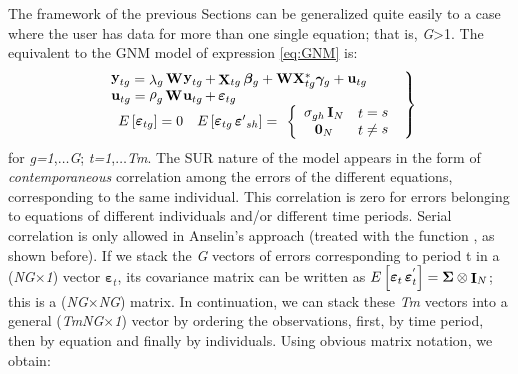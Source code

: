 \documentclass[article]{jss}
\begin{document}
The framework of the previous Sections can be generalized quite easily to a case where the user has data for more than one single equation; that is, \emph{G}\textgreater{}1. The equivalent to the GNM model of expression \eqref{eq:GNM} is:
\begin{equation}
\left.\begin{array}{lll}

{\mathop{{\bf y}}\nolimits_{tg} =\mathop{\lambda }\nolimits_{g} {\bf W} \mathop{{\bf y}}\nolimits_{tg} +\mathop{{\bf X}}\nolimits_{tg} {\boldsymbol \beta}_{g}+{\bf W} {\bf X}_{tg}^* {\boldsymbol \gamma}_{g}+\mathop{{\bf u}}\nolimits_{tg} } \\
{\mathop{{\bf u}}\nolimits_{tg} =\mathop{\rho }\nolimits_{g} {\bf W} \mathop{{\bf u}}\nolimits_{tg} +\mathop{{\boldsymbol \varepsilon}}\nolimits_{tg} }\\
\begin{array}{cc}

 {E\left[\mathop{{\boldsymbol \varepsilon}}\nolimits_{tg} \right]=0} & {E\left[\mathop{{\boldsymbol \varepsilon}}\nolimits_{\mathop{tg}} \mathop{{\boldsymbol \varepsilon}'}\nolimits_{\mathop{sh}} \right]=}
\end{array}

\left\{\begin{array}{cc} {\mathop{\sigma}\nolimits_{gh} {\bf I}_{N}} & {\mathop{t} = \mathop{s}} \\ {{\bf 0}_{N} } & {\mathop{t} \ne \mathop{s} }
\end{array}\right.

\end{array}\right\}
\label{eq:sure}
\end{equation}
for \emph{g=1},\(\ldots\)\emph{G}; \emph{t=1},\(\ldots\)\emph{Tm}. The SUR nature of the model appears in the form of \emph{contemporaneous} correlation among the errors of the different equations, corresponding to the same individual. This correlation is zero for errors belonging to equations of different individuals and/or different time periods. Serial correlation is only allowed in Anselin's approach (treated with the function , as shown before). If we stack the \emph{G} vectors of errors corresponding to period t in a (\emph{NG}\(\times\)\emph{1}) vector \({\boldsymbol \varepsilon}_{t}\), its covariance matrix can be written as \(E\left[\mathop{{\boldsymbol \varepsilon}}\nolimits_{t} \mathop{{\boldsymbol \varepsilon}}\nolimits_{t}^{'} \right]= {\boldsymbol \Sigma} \otimes \mathop{{\bf I}}\nolimits_{N}\); this is a (\emph{NG}\(\times\)\emph{NG}) matrix. In continuation, we can stack these \emph{Tm} vectors into a general (\emph{TmNG}\(\times\)\emph{1}) vector by ordering the observations, first, by time period, then by equation and finally by individuals. Using obvious matrix notation, we obtain:
\end{document}
